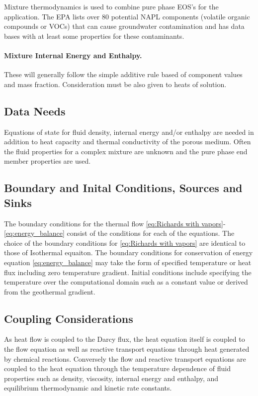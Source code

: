Mixture thermodynamics is used to combine pure phase EOS's for the application.  
The EPA lists over 80 potential NAPL components
(volatile organic compounds or VOCs) that can cause groundwater
contamination and has data bases with at least some properties for these
contaminants.


\paragraph{Mixture Internal Energy and Enthalpy.} 
%
These will generally follow the simple additive rule based of
component values and mass fraction. Consideration must be also given
to heats of solution.


\subsection{Data Needs}

Equations of state for fluid density, internal energy and/or enthalpy are needed 
in addition to heat capacity and thermal conductivity of the porous medium. 
Often the fluid properties for a complex mixture are unknown and the pure phase end member properties are used. 

\subsection{Boundary and Inital Conditions, Sources and Sinks}

The boundary conditions for the thermal flow 
\eqref{eq:Richards with vapors}-\eqref{eq:energy_balance}
consist of the conditions for each of the equations.
The choice of the boundary conditions for \eqref{eq:Richards with vapors} are identical to those of Isothermal equaiton.
The boundary conditions for conservation of energy equation \eqref{eq:energy_balance}
may take the form of specified temperature or heat flux including zero temperature gradient. 
Initial conditions include specifying the temperature over the computational domain 
such as a constant value or derived from the geothermal gradient.

\subsection{Coupling Considerations}

As heat flow is coupled to the Darcy flux, the heat equation itself is coupled to the flow equation 
as well as reactive transport equations through heat generated by chemical reactions. 
Conversely the flow and reactive transport equations are coupled to the heat equation 
through the temperature dependence of fluid properties such as density, viscosity, internal energy and enthalpy, 
and equilibrium thermodynamic and kinetic rate constants.

